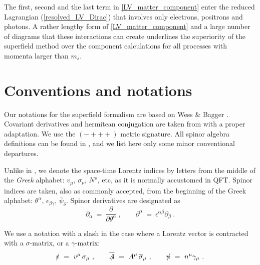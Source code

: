 \documentclass[12pt]{revtex4}
\newcommand{\slashed}[1]{\hbox{{$#1$}\llap{$/$}}}
\begin{document}
%
The first, second and the last term in \eqref{LV_matter_component}  enter 
the reduced Lagrangian (\ref{resolved_LV_Dirac}) that involves only
electrons, positrons and photons. A rather lengthy form of
\eqref{LV_matter_component} and a large number of diagrams that 
these interactions can create underlines the superiority of the 
superfield method over the component calculations for 
all processes with momenta larger than $m_s$. 

\section{Conventions and notations}
\label{app_conventions}

Our notations for the superfield formalism are based on 
Wess \& Bagger 
\cite{Wess:1992cp}.
Covariant derivatives and hermitean conjugation are taken from
\cite{Gates:1983nr}
with a proper adaptation. 
We use the   
$ (-+++) $ metric signature.
All spinor algebra definitions can be found in 
\cite{Wess:1992cp},
and we list here only some minor conventional departures.

Unlike in \cite{Wess:1992cp}, we denote the space-time Lorentz
indices by letters from the middle of the \emph{Greek}
alphabet:
$ v_\mu $, $ \sigma_\nu $, $ N^\rho $, etc,
as it is normally accustomed in QFT.
Spinor indices are taken, also as commonly accepted, from the
beginning of the Greek alphabet:
$ \theta^\alpha $, $ \epsilon_{\beta\gamma} $, 
$ \overline{\psi}_{\dot\delta}$.
Spinor derivatives are designated as
\[ 
\partial_\alpha ~=~ \frac{\partial}{\partial\theta^\alpha}~,
\qquad
\partial^\alpha ~=~ \epsilon^{\alpha\beta}\partial_\beta~.
\]

We use a notation with a slash in the case where a Lorentz
vector is contracted with a $ \sigma $-matrix, or a $ \gamma $-matrix:
%
\begin{equation}
\label{def_slashed}
\slashed{v} ~=~ v^\mu\, \sigma_\mu~, 
\qquad
\overline{\slashed{A}} ~=~ A^\mu\, \overline{\sigma}_\mu~, 
\qquad
\slashed{n} ~=~ n^\mu \gamma_\mu~.
\end{equation}
%
\end{document}
